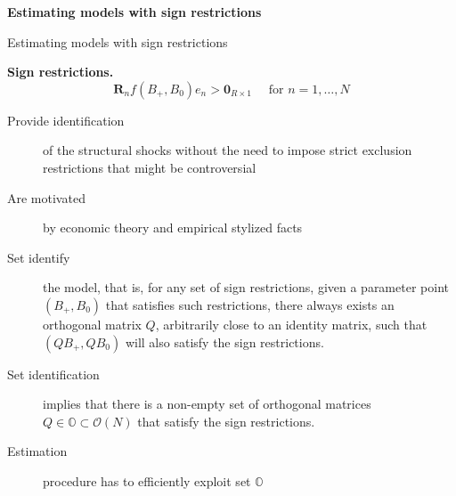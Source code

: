 \documentclass[notes,blackandwhite,mathsans,usenames,dvipsnames]{beamer}
\begin{document}
{
\begin{frame}

\begin{adjustwidth}{-0.5cm}{0cm}
\vspace{8.3cm}\Large
\textbf{{\color{mcxs2}Estimating models with} {\color{mcxs1}sign restrictions}}
\end{adjustwidth}

\end{frame}
}





\begin{frame}{Estimating models with sign restrictions}

\textbf{Sign restrictions.}
$$ \mathbf{R}_n f\left(B_+,B_0\right) e_n > \mathbf{0}_{R\times 1} \quad\text{ for } n=1,\dots,N $$

\small\smallskip
\begin{description}
\item[Provide identification]{\color{mcxs2} of the structural shocks without the need to impose strict exclusion restrictions that might be controversial}
\item[Are motivated] {\color{mcxs2}by economic theory and empirical stylized facts}
\item[Set identify] {\color{mcxs2}the model, that is, for any set of sign restrictions, given a parameter point} $(B_+,B_0)$ {\color{mcxs2}that satisfies such restrictions, there always exists an orthogonal matrix} $Q${\color{mcxs2}, arbitrarily close to an identity matrix, such that} $(QB_+,QB_0)$ {\color{mcxs2}will also satisfy the sign restrictions.}
\item[Set identification] {\color{mcxs2}implies that there is a non-empty set of orthogonal matrices} $Q\in\mathbb{O}\subset\mathcal{O}(N)$ {\color{mcxs2}that satisfy the sign restrictions.}
\item[Estimation] {\color{mcxs2}procedure has to efficiently exploit set} $\mathbb{O}$
\end{description}

\end{frame}
\end{document}

